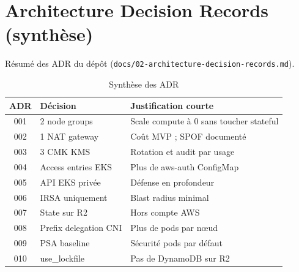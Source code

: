 \chapter{Architecture Decision Records (synthèse)}
\label{ann:adr}

Résumé des ADR du dépôt (\texttt{docs/02-architecture-decision-records.md}).

\begin{table}[H]
\centering
\small
\begin{tabular}{@{}clp{8cm}@{}}
\toprule
\textbf{ADR} & \textbf{Décision} & \textbf{Justification courte} \\
\midrule
001 & 2 node groups & Scale compute à 0 sans toucher stateful \\
002 & 1 NAT gateway & Coût MVP ; SPOF documenté \\
003 & 3 CMK KMS & Rotation et audit par usage \\
004 & Access entries EKS & Plus de aws-auth ConfigMap \\
005 & API EKS privée & Défense en profondeur \\
006 & IRSA uniquement & Blast radius minimal \\
007 & State sur R2 & Hors compte AWS \\
008 & Prefix delegation CNI & Plus de pods par nœud \\
009 & PSA baseline & Sécurité pods par défaut \\
010 & use\_lockfile & Pas de DynamoDB sur R2 \\
\bottomrule
\end{tabular}
\caption{Synthèse des ADR}
\end{table}
